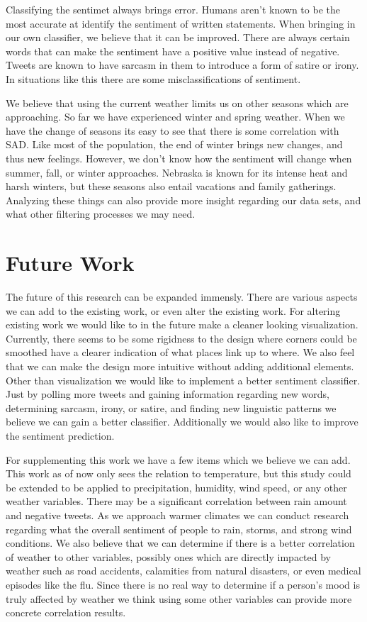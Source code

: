 \documentclass[journal]{vgtc}                %
\begin{document}
Classifying the sentimet always brings error. Humans aren't known to be the most accurate at identify the sentiment of written statements. \cite{pangthumbs} When bringing in our own classifier, we believe that it can be improved. There are always certain words that can make the sentiment have a positive value instead of negative. Tweets are known to have sarcasm in them to introduce a form of satire or irony. \cite{riloff2013sarcasm} In situations like this there are some misclassifications of sentiment.

We believe that using the current weather limits us on other seasons which are approaching. So far we have experienced winter and spring weather. When we have the change of seasons its easy to see that there is some correlation with SAD. Like most of the population, the end of winter brings new changes, and thus new feelings. However, we don't know how the sentiment will change when summer, fall, or winter approaches. Nebraska is known for its intense heat and harsh winters, but these seasons also entail vacations and family gatherings. Analyzing these things can also provide more insight regarding our data sets, and what other filtering processes we may need.

\section{Future Work}

The future of this research can be expanded immensly. There are various aspects we can add to the existing work, or even alter the existing work. For altering existing work we would like to in the future make a cleaner looking visualization. Currently, there seems to be some rigidness to the design where corners could be smoothed have a clearer indication of what places link up to where. We also feel that we can make the design more intuitive without adding additional elements. Other than visualization we would like to implement a better sentiment classifier. Just by polling more tweets and gaining information regarding new words, determining sarcasm, irony, or satire, and finding new linguistic patterns we believe we can gain a better classifier. Additionally we would also like to improve the sentiment prediction.

For supplementing this work we have a few items which we believe we can add. This work as of now only sees the relation to temperature, but this study could be extended to be applied to precipitation, humidity, wind speed, or any other weather variables. There may be a significant correlation between rain amount and negative tweets. As we approach warmer climates we can conduct research regarding what the overall sentiment of people to rain, storms, and strong wind conditions. We also believe that we can determine if there is a better correlation of weather to other variables, possibly ones which are directly impacted by weather such as road accidents, calamities from natural disasters, or even medical episodes like the flu. Since there is no real way to determine if a person's mood is truly affected by weather we think using some other variables can provide more concrete correlation results. 
\end{document}
